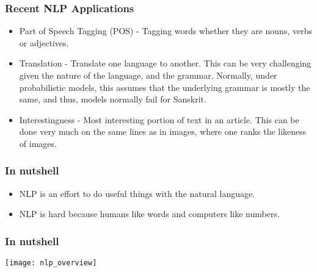 \begin{frame}[fragile]\frametitle{Recent NLP Applications}
  \begin{itemize}
  \item Part of Speech Tagging (POS) - Tagging words whether they are nouns, verbs or adjectives.
  \item Translation - Translate one language to another. This can be very challenging given the nature of the language, and the grammar. Normally, under probabilistic models, this assumes that the underlying grammar is mostly the same, and thus, models normally fail for Sanskrit.
  \item Interestingness - Most interesting portion of text in an article. This can be done very much on the same lines as in images, where one ranks the likeness of images.


  \end{itemize}
\end{frame}

\begin{frame}[fragile]\frametitle{In nutshell}
  \begin{itemize}
  \item NLP is an effort to do useful things with the natural language.
   \item NLP is hard because humans like words and computers like numbers.
  \end{itemize}
\end{frame}

\begin{frame}[fragile]\frametitle{In nutshell}
\begin{center}
\texttt{[image: nlp\_overview]}
\end{center}
\end{frame}
